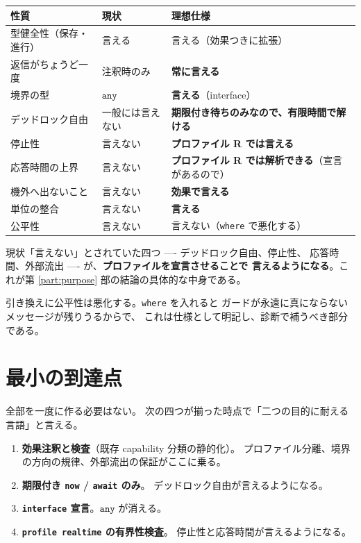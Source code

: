 \documentclass[11pt,a4paper]{ltjsarticle}
\theoremstyle{remark}
\newcommand{\ty}[1]{\ensuremath{\mathtt{#1}}}
\begin{document}
\begin{center}
\small
\begin{tabular}{@{}lll@{}}
\toprule
性質 & 現状 & 理想仕様 \\
\midrule
型健全性（保存・進行）& 言える & 言える（効果つきに拡張）\\
返信がちょうど一度 & 注釈時のみ & \textbf{常に言える} \\
境界の型 & \ty{any} & \textbf{言える}（interface）\\
デッドロック自由 & 一般には言えない &
  \textbf{期限付き待ちのみなので、有限時間で解ける} \\
停止性 & 言えない & \textbf{プロファイル R では言える} \\
応答時間の上界 & 言えない &
  \textbf{プロファイル R では解析できる}（宣言があるので）\\
機外へ出ないこと & 言えない & \textbf{効果で言える} \\
単位の整合 & 言えない & \textbf{言える} \\
公平性 & 言えない & 言えない（\texttt{where} で悪化する）\\
\bottomrule
\end{tabular}
\end{center}

現状「言えない」とされていた四つ ---- デッドロック自由、停止性、
応答時間、外部流出 ---- が、\textbf{プロファイルを宣言させることで
言えるようになる}。これが第 \ref{part:purpose} 部の結論の具体的な中身である。

引き換えに公平性は悪化する。\texttt{where} を入れると
ガードが永遠に真にならないメッセージが残りうるからで、
これは仕様として明記し、診断で補うべき部分である。

\section{最小の到達点}

全部を一度に作る必要はない。
次の四つが揃った時点で「二つの目的に耐える言語」と言える。

\begin{enumerate}
\item \textbf{効果注釈と検査}（既存 capability 分類の静的化）。
  プロファイル分離、境界の方向の規律、外部流出の保証がここに乗る。
\item \textbf{期限付き \texttt{now} / \texttt{await} のみ}。
  デッドロック自由が言えるようになる。
\item \textbf{\texttt{interface} 宣言}。\ty{any} が消える。
\item \textbf{\texttt{profile realtime} の有界性検査}。
  停止性と応答時間が言えるようになる。
\end{enumerate}
\end{document}
